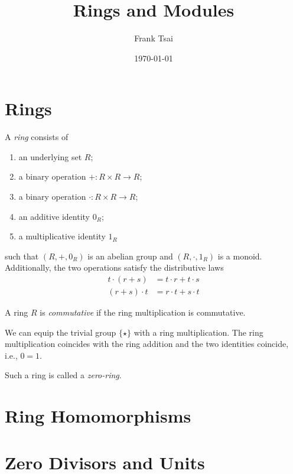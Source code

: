 \documentclass{amsart}
\title{Rings and Modules}
\author{Frank Tsai}
\date{\today}
\begin{document}
\maketitle
\tableofcontents

\section{Rings}
\label{sec:rings}

\begin{defn}
  A \emph{ring} consists of
  \begin{enumerate}
  \item an underlying set $R$;
  \item a binary operation $+ : R \times R \to R$;
  \item a binary operation $\cdot : R \times R \to R$;
  \item an additive identity $0_{R}$;
  \item a multiplicative identity $1_{R}$
  \end{enumerate}
  such that $(R,+,0_{R})$ is an abelian group and $(R,\cdot,1_{R})$ is a monoid.
  Additionally, the two operations satisfy the distributive laws
  \begin{align}
    t \cdot (r + s) &= t \cdot r + t \cdot s\\
    (r + s) \cdot t &= r \cdot t + s \cdot t
  \end{align}
\end{defn}

\begin{defn}
  A ring $R$ is \emph{commutative} if the ring multiplication is commutative.
\end{defn}

We can equip the trivial group $\{\star\}$ with a ring multiplication.
The ring multiplication coincides with the ring addition and the two identities coincide, i.e., $0 = 1$.
\begin{defn}
  Such a ring is called a \emph{zero-ring}.
\end{defn}

\section{Ring Homomorphisms}
\label{sec:ring-homomorphisms}


\section{Zero Divisors and Units}
\label{sec:zero-divisors-and-units}
\end{document}
